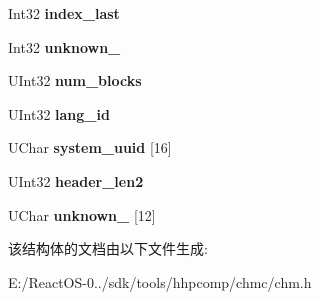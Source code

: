 \begin{DoxyCompactItemize}
\mbox{\label{structchmc_itsp_header_af25735130d72d84fd28a806d72918d1f}} 
Int32 {\bfseries index\+\_\+last}
\item 
\mbox{\label{structchmc_itsp_header_ad7e44f8ce804620dccd61eb7fdedd8ab}} 
Int32 {\bfseries unknown\+\_}
\item 
\mbox{\label{structchmc_itsp_header_a381d5e72eb807659685c2a805357be60}} 
U\+Int32 {\bfseries num\+\_\+blocks}
\item 
\mbox{\label{structchmc_itsp_header_ab44efdc3550a13c6f4113eaef02900c3}} 
U\+Int32 {\bfseries lang\+\_\+id}
\item 
\mbox{\label{structchmc_itsp_header_ae7c4566d0dcaf12465389c8f55876ac5}} 
U\+Char {\bfseries system\+\_\+uuid} \mbox{[}16\mbox{]}
\item 
\mbox{\label{structchmc_itsp_header_a6f94174c3e956b9984d4e76156141bb4}} 
U\+Int32 {\bfseries header\+\_\+len2}
\item 
\mbox{\label{structchmc_itsp_header_ab9647338ca396cda5e77aa117bbf4094}} 
U\+Char {\bfseries unknown\+\_} \mbox{[}12\mbox{]}
\end{DoxyCompactItemize}


该结构体的文档由以下文件生成\+:\begin{DoxyCompactItemize}
\item 
E\+:/\+React\+O\+S-\/0../sdk/tools/hhpcomp/chmc/chm.\+h\end{DoxyCompactItemize}
